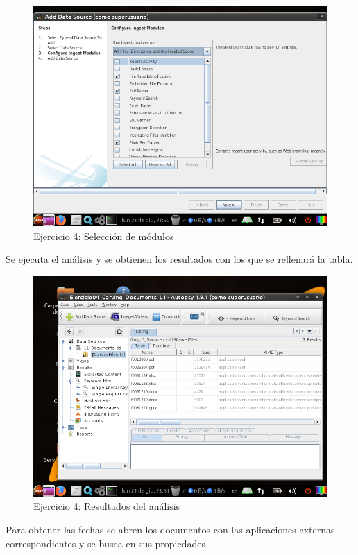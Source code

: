 \documentclass[11pt]{article}
\begin{document}
\begin{figure}[H]
    \caption{Ejercicio 4: Selección de módulos}
    \centering
    \includegraphics[scale=0.7]{e4-4.png}
\end{figure}

Se ejecuta el análisis y se obtienen los resultados con los que se rellenará la tabla.

\begin{figure}[H]
    \caption{Ejercicio 4: Resultados del análisis}
    \centering
    \includegraphics[scale=0.7]{e4-5.png}
\end{figure}

Para obtener las fechas se abren los documentos con las aplicaciones externas correspondientes y se busca en sus propiedades.
\end{document}

